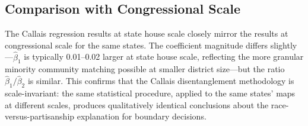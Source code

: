 \subsection{Comparison with Congressional Scale}

The Callais regression results at state house scale closely mirror the results at congressional scale for the same states. The coefficient magnitude differs slightly---$\hat\beta_1$ is typically 0.01--0.02 larger at state house scale, reflecting the more granular minority community matching possible at smaller district size---but the ratio $\hat\beta_1/\hat\beta_2$ is similar. This confirms that the Callais disentanglement methodology is scale-invariant: the same statistical procedure, applied to the same states' maps at different scales, produces qualitatively identical conclusions about the race-versus-partisanship explanation for boundary decisions.
